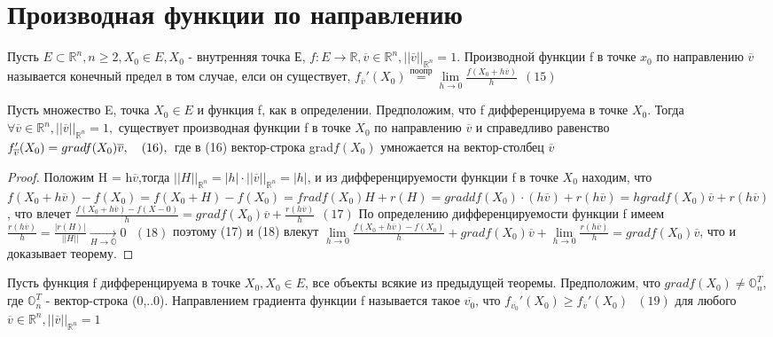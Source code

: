 \section{Производная функции по направлению}
\begin{definition}
	Пусть $E \subset \mathbb{R}^n, n \geq 2, X_0 \in E, X_0$ - внутренняя точка Е, $f : E \to \mathbb{R}, \overline{v} \in \mathbb{R}^n, ||\overline{v}||_{\mathbb{R}^n} = 1.$ Производной функции f в точке $x_0$ по направлению $\overline{v}$ называется конечный предел в том случае, елси он существует, $f_{\overline{v}}'(X_0) \overset{по опр}{=} \lim\limits_{h \to 0}{\frac{f(X_0 + h\overline{v})}{h}} \ \ (15)$ 
\end{definition}
\begin{theorem}
	Пусть множество E, точка $X_0 \in E$ и функция f, как в определении. Предположим, что f дифференцируема в точке $X_0$. Тогда $\forall \overline{v} \in \mathbb{R}^n, ||\overline{v}||_{\mathbb{R}^n}=1,$ существует производная функции f в точке $X_0$ по направлению $\overline{v}$ и справедливо равенство $f_{\overline{v}}'(X_0)= grad f(X_0)\overline{v}, \ \ \ (16),\\ $
	где в (16) вектор-строка grad$f(X_0)$ умножается на вектор-столбец $\overline{v}$
\end{theorem}
\begin{proof}
	Положим H = h$\overline{v}$,тогда $||H||_{\mathbb{R}^n} = |h|\cdot||\overline{v}||_{\mathbb{R}^n} = |h|$, и из дифференцируемости функции f в точке $X_0$ находим, что $f(X_0+h\overline{v})-f(X_0) = f(X_0 + H) - f(X_0) = frad f(X_0)H + r(H) = gradd f(X_0)\cdot (h\overline{v}) + r(h\overline{v}) = h grad f(X_0)\overline{v} + r(h\overline{v})$, что влечет $\frac{f(X_0 + h\overline{v})-f(X-0)}{h} = grad f(X_0) \overline{v} + \frac{r(h\overline{v})}{h} \ \ (17)$ По определению дифференцируемости функции f имеем $\frac{r(h\overline{v})}{h} =  \frac{|r(H)|}{||H||} \underset{H \to \mathbb{O}}{\to} 0 \ \ \ (18)$ поэтому (17) и (18) влекут $\lim\limits_{h \to 0}{\frac{f(X_0+h\overline{v})-f(X_0)}{h}} + grad f(X_0)\overline{v} + \lim\limits_{h \to 0}{\frac{r(h\overline{v})}{h}} = grad f(X_0)\overline{v}$, что и доказывает теорему. 
\end{proof}
\begin{definition}
	Пусть функция f дифференцируема в точке $X_0,X_0 \in E$, все объекты всякие из предыдущей теоремы. Предположим, что $grad f(X_0) \neq \mathbb{O}_n^T,$ где $\mathbb{O}_n^T$ - вектор-строка (0,..0). Направлением градиента функции f называется такое $\overline{v_0}$, что $f_{\overline{v_0}}'(X_0) \geq f_{\overline{v}}'(X_0) \ \  \ (19)$ для любого $\overline{v} \in \mathbb{R}^n, ||\overline{v}||_{\mathbb{R}^n}=1$
\end{definition}
